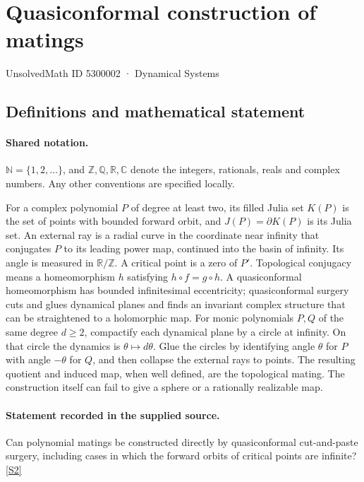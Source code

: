 \documentclass[11pt]{article}
\newcommand{\sref}[2]{\hyperlink{source:#1:#2}{[S#2]}}
\begin{document}
\setcounter{section}{5300001}
\section{Quasiconformal construction of matings}\label{5300002}
{\small\sffamily UnsolvedMath ID 5300002 · Dynamical Systems}
\subsection{Definitions and mathematical statement}

\paragraph{Shared notation.}$\mathbb N=\{1,2,\ldots\}$, and $\mathbb Z,\mathbb Q,\mathbb R,\mathbb C$ denote the integers, rationals, reals and complex numbers. Any other conventions are specified locally.


For a complex polynomial $P$ of degree at least two, its filled Julia set $K(P)$ is the set of points with bounded forward orbit, and $J(P)=\partial K(P)$ is its Julia set. An external ray is a radial curve in the coordinate near infinity that conjugates $P$ to its leading power map, continued into the basin of infinity. Its angle is measured in $\mathbb R/\mathbb Z$. A critical point is a zero of $P'$. Topological conjugacy means a homeomorphism $h$ satisfying $h\circ f=g\circ h$. A quasiconformal homeomorphism has bounded infinitesimal eccentricity; quasiconformal surgery cuts and glues dynamical planes and finds an invariant complex structure that can be straightened to a holomorphic map.
For monic polynomials $P,Q$ of the same degree $d\geq2$, compactify each dynamical plane by a circle at infinity. On that circle the dynamics is $\theta\mapsto d\theta$. Glue the circles by identifying angle $\theta$ for $P$ with angle $-\theta$ for $Q$, and then collapse the external rays to points. The resulting quotient and induced map, when well defined, are the topological mating. The construction itself can fail to give a sphere or a rationally realizable map.
\paragraph{Statement recorded in the supplied source.}
Can polynomial matings be constructed directly by quasiconformal cut-and-paste surgery, including cases in which the forward orbits of critical points are infinite? \sref{5300002}{2}
\end{document}

